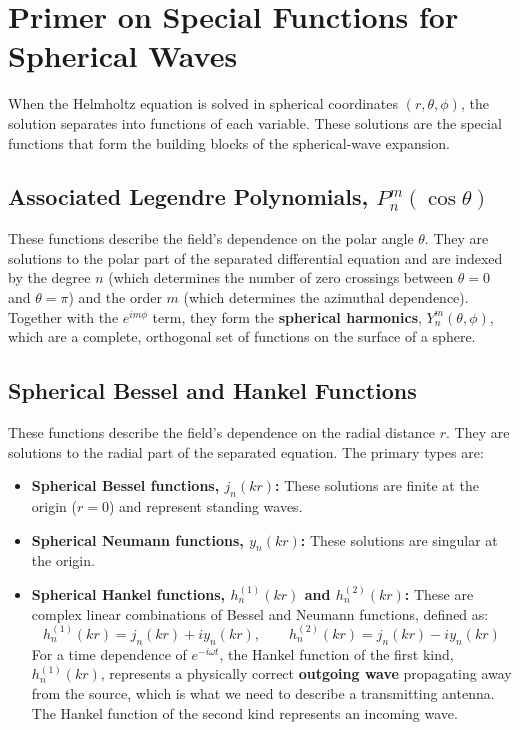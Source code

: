 \documentclass[11pt]{article}
\begin{document}
\section{Primer on Special Functions for Spherical Waves}

When the Helmholtz equation is solved in spherical coordinates $(r, \theta, \phi)$, the solution separates into functions of each variable. These solutions are the special functions that form the building blocks of the spherical-wave expansion.

\subsection{Associated Legendre Polynomials, $P_n^m(\cos\theta)$}
These functions describe the field's dependence on the polar angle $\theta$. They are solutions to the polar part of the separated differential equation and are indexed by the degree $n$ (which determines the number of zero crossings between $\theta=0$ and $\theta=\pi$) and the order $m$ (which determines the azimuthal dependence). Together with the $e^{im\phi}$ term, they form the \textbf{spherical harmonics}, $Y_n^m(\theta, \phi)$, which are a complete, orthogonal set of functions on the surface of a sphere.

\subsection{Spherical Bessel and Hankel Functions}
These functions describe the field's dependence on the radial distance $r$. They are solutions to the radial part of the separated equation. The primary types are:
\begin{itemize}
    \item \textbf{Spherical Bessel functions, $j_n(kr)$:} These solutions are finite at the origin ($r=0$) and represent standing waves.
    \item \textbf{Spherical Neumann functions, $y_n(kr)$:} These solutions are singular at the origin.
    \item \textbf{Spherical Hankel functions, $h_n^{(1)}(kr)$ and $h_n^{(2)}(kr)$:} These are complex linear combinations of Bessel and Neumann functions, defined as:
    \[
    h_n^{(1)}(kr) = j_n(kr) + i y_n(kr), \qquad h_n^{(2)}(kr) = j_n(kr) - i y_n(kr)
    \]
    For a time dependence of $e^{-i\omega t}$, the Hankel function of the first kind, $h_n^{(1)}(kr)$, represents a physically correct \textbf{outgoing wave} propagating away from the source, which is what we need to describe a transmitting antenna. The Hankel function of the second kind represents an incoming wave.
\end{itemize}
\end{document}
